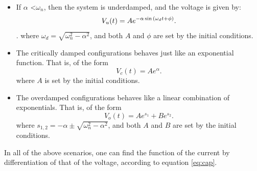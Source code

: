 \documentclass[12pt,twoside]{extarticle}
\begin{document}
\begin{itemize}\setlength\itemsep{0.25em}
    \item  If $\alpha$ <$\omega_n$, then the system is underdamped, and the voltage is given by:
        \begin{equation} V_u(t)=Ae^{-\alpha  \sin \qty(\omega_d t + \phi)}.\end{equation}. 
        where $\omega_d = \sqrt{\omega_n^2-\alpha^2}$, and both $A$ and $\phi$ are set by the initial conditions.
    \item  The critically damped configurations behaves just like an exponential function. That is, of the form 
        \begin{equation} V_c(t)=Ae^{\alpha}.\end{equation}
        where $A$ is set by the initial conditions.
    \item  The overdamped configurations behaves like a linear combination of exponentials. That is, of the form 
        \begin{equation} V_o(t)=Ae^{s_1}+Be^{s_2} .\end{equation}
        where $s_{1,2} =-\alpha\pm \sqrt{\omega_n^2-\alpha^2}$, and both $A$ and $B$ are set by the initial conditions.
\end{itemize}

In all of the above scenarios, one can find the function of the current by differentiation of that of the voltage, according to equation \ref{eq:cap}.
\end{document}
